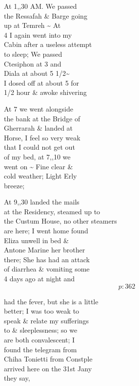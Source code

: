 \documentclass{report}
\begin{document}

	\par{
 	At 1,,30 AM. We passed\ \\the Ressafah \& Barge going\ \\up at Temreh \~{} At\ \\4 I again went into my\ \\Cabin after a useless attempt\ \\to sleep; We passed\ \\Ctesiphon at 3 and\ \\Diala at about 5 1/2\~{}\ \\I dosed off at about 5 for\ \\1/2 hour \& awoke shivering\ \\
	}

	\par{
 	At 7 we went alongside\ \\the bank at the Bridge of\ \\Gherrarah \& landed at\ \\Horse, I feel so very weak\ \\that I could not get out\ \\of my bed, at 7,,10 we\ \\went on \~{} Fine clear \&\ \\cold weather; Light Erly\ \\breeze;\ \\
	}

	\par{
 	At 9,,30 landed the mails\ \\at the Residency, steamed up to\ \\the Custum House, no other steamers\ \\are here; I went home found\ \\Eliza unwell in bed \&\ \\Antone Marine her brother\ \\there; She has had an attack\ \\of diarrhea \& vomiting some\ \\4 days ago at night and\ \\
  \[p: 362 \]

	}

	\par{
 	had the fever, but she is a little\ \\better; I was too weak to\ \\speak \& relate my sufferings\ \\to \& sleeplessness; so we\ \\are both convalescent; I\ \\found the telegram from\ \\Chiha Tonietti from Constple\ \\arrived here on the 31st Jany\ \\they say,\ \\
	}
\end{document}
